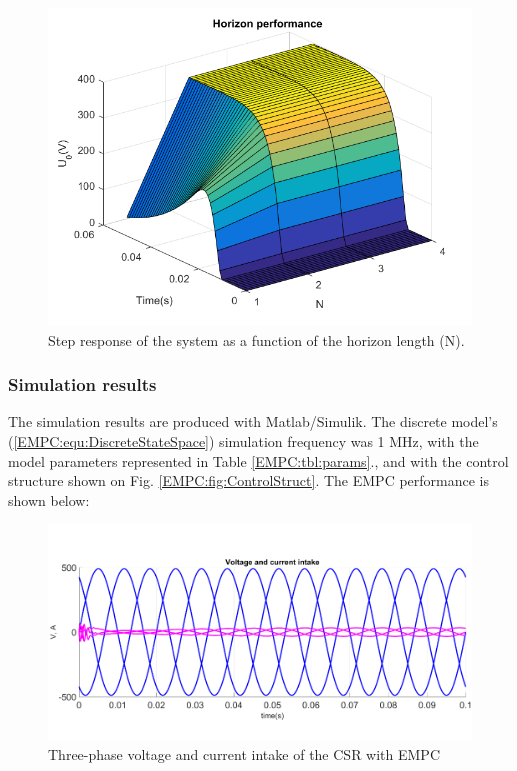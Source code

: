     \begin{figure}[!ht]
        \centering
        \includegraphics[width=\textwidth]{EMPC_PNG_Pics/MultiHorizon.png}
        \caption{Step response of the system as a function of the horizon length (N).}
        \label{EMPC:fig:MultiHorizon}
    \end{figure}

    \subsubsection{Simulation results}\label{EMPC:sec:Results}

    The simulation results are produced with Matlab/Simulik. The discrete model's (\ref{EMPC:equ:DiscreteStateSpace}) simulation frequency was 1 MHz, with the model parameters represented in Table \ref{EMPC:tbl:params}., and with the control structure shown on Fig. \ref{EMPC:fig:ControlStruct}. The EMPC performance is shown below:

    \begin{figure}[!ht]
        \centering
        \includegraphics[width=\textwidth]{EMPC_PNG_Pics/Result_3fEMPC.png}
        \caption{Three-phase voltage and current intake of the CSR with EMPC}
        \label{EMPC:fig:Result_3fEMPC}
    \end{figure}

